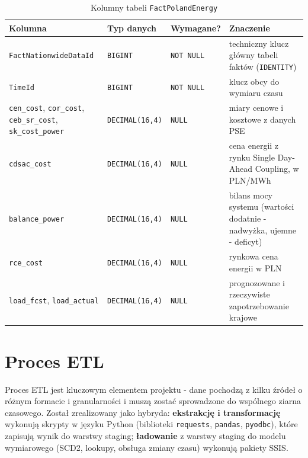 \documentclass[12pt]{article}
\begin{document}
	\begin{table}[H]
		\centering
		\small
		\begin{tabularx}{\textwidth}{|p{3.9cm}|p{2.4cm}|p{2.5cm}|X|}
			\hline
			\textbf{Kolumna} & \textbf{Typ danych} & \textbf{Wymagane?} & \textbf{Znaczenie} \\
			\hline
			\texttt{FactNationwideDataId} & \texttt{BIGINT} & \texttt{NOT NULL} & techniczny klucz główny tabeli faktów (\texttt{IDENTITY}) \\
			\hline
			\texttt{TimeId} & \texttt{BIGINT} & \texttt{NOT NULL} & klucz obcy do wymiaru czasu \\
			\hline
			\texttt{cen\_cost}, \texttt{cor\_cost}, \texttt{ceb\_sr\_cost}, \texttt{sk\_cost\_power} & \texttt{DECIMAL(16,4)} & \texttt{NULL} & miary cenowe i kosztowe z danych PSE \\
			\hline
			\texttt{cdsac\_cost} & \texttt{DECIMAL(16,4)} & \texttt{NULL} & cena energii z rynku Single Day-Ahead Coupling, w PLN/MWh \\
			\hline
			\texttt{balance\_power} & \texttt{DECIMAL(16,4)} & \texttt{NULL} & bilans mocy systemu (wartości dodatnie - nadwyżka, ujemne - deficyt) \\
			\hline
			\texttt{rce\_cost} & \texttt{DECIMAL(16,4)} & \texttt{NULL} & rynkowa cena energii w PLN \\
			\hline
			\texttt{load\_fcst}, \texttt{load\_actual} & \texttt{DECIMAL(16,4)} & \texttt{NULL} & prognozowane i rzeczywiste zapotrzebowanie krajowe \\
			\hline
		\end{tabularx}
		\caption{Kolumny tabeli \texttt{FactPolandEnergy}}
	\end{table}

	\newpage
	\section{Proces ETL}

	Proces ETL jest kluczowym elementem projektu - dane pochodzą z kilku źródeł o różnym formacie i granularności i muszą zostać sprowadzone do wspólnego ziarna czasowego. Został zrealizowany jako hybryda: \textbf{ekstrakcję i transformację} wykonują skrypty w języku Python (biblioteki \texttt{requests}, \texttt{pandas}, \texttt{pyodbc}), które zapisują wynik do warstwy staging; \textbf{ładowanie} z warstwy staging do modelu wymiarowego (SCD2, lookupy, obsługa zmiany czasu) wykonują pakiety SSIS.
\end{document}
